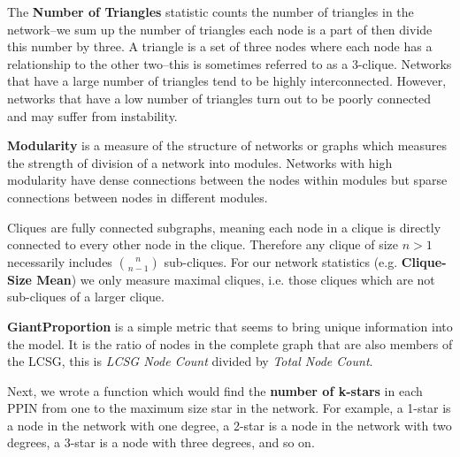 \documentclass[12pt]{article}
\begin{document}
The \textbf{Number of Triangles} statistic counts the number of triangles in the network--we sum up the number of triangles each node is a part of then divide this number by three. A triangle is a set of three nodes where each node has a relationship to the other two--this is sometimes referred to as a 3-clique. Networks that have a large number of triangles tend to be highly interconnected. However, networks that have a low number of triangles turn out to be poorly connected and may suffer from instability.

\textbf{Modularity} is a measure of the structure of networks or graphs which measures the strength of division of a network into modules. Networks with high modularity have dense connections between the nodes within modules but sparse connections between nodes in different modules.

Cliques are fully connected subgraphs, meaning each node in a clique is directly connected to every other node in the clique. Therefore any clique of size $n>1$ necessarily includes ${n \choose n-1}$ sub-cliques. For our network statistics (e.g. \textbf{Clique-Size Mean}) we only measure maximal cliques, i.e. those cliques which are not sub-cliques of a larger clique. 

\textbf{GiantProportion} is a simple metric that seems to bring unique information into the model. It is the ratio of nodes in the complete graph that are also members of the LCSG, this is \textit{LCSG Node Count} divided by \textit{Total Node Count}.

Next, we wrote a function which would find the \textbf{number of k-stars} in each PPIN from one to the maximum size star in the network. For example, a 1-star is a node in the network with one degree, a 2-star is a node in the network with two degrees, a 3-star is a node with three degrees, and so on. 
\end{document}
